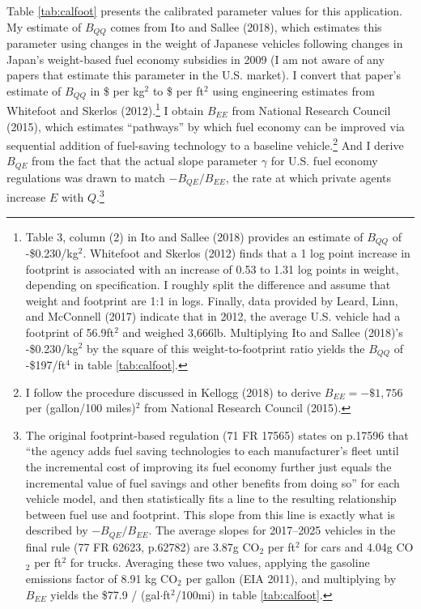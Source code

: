 \documentclass[12pt]{article}
\begin{document}
Table \ref{tab:calfoot} presents the calibrated parameter values for this application. My estimate of $B_{QQ}$ comes from Ito and Sallee (2018), which estimates this parameter using changes in the weight of Japanese vehicles following changes in Japan's weight-based fuel economy subsidies in 2009 (I am not aware of any papers that estimate this parameter in the U.S. market). I convert that paper's estimate of $B_{QQ}$ in \$ per kg$^2$ to \$ per ft$^2$ using engineering estimates from Whitefoot and Skerlos (2012).\footnote{Table 3, column (2) in Ito and Sallee (2018) provides an estimate of $B_{QQ}$ of -\$0.230/kg$^2$. Whitefoot and Skerlos (2012) finds that a 1 log point increase in footprint is associated with an increase of 0.53 to 1.31 log points in weight, depending on specification. I roughly split the difference and assume that weight and footprint are 1:1 in logs. Finally, data provided by Leard, Linn, and McConnell (2017) indicate that in 2012, the average U.S. vehicle had a footprint of 56.9ft$^2$ and weighed 3,666lb. Multiplying Ito and Sallee (2018)'s -\$0.230/kg$^2$ by the square of this weight-to-footprint ratio yields the $B_{QQ}$ of -\$197/ft$^4$ in table \ref{tab:calfoot}.} I obtain $B_{EE}$ from National Research Council (2015), which estimates ``pathways'' by which fuel economy can be improved via sequential addition of fuel-saving technology to a baseline vehicle.\footnote{I follow the procedure discussed in Kellogg (2018) to derive $B_{EE}=-\$1,756$ per (gallon/100 miles)$^2$ from National Research Council (2015).} And I derive $B_{QE}$ from the fact that the actual slope parameter $\gamma$ for U.S. fuel economy regulations was drawn to match $-B_{QE}/B_{EE}$, the rate at which private agents increase $E$ with $Q$.\footnote{The original footprint-based regulation (71 FR 17565) states on p.17596 that ``the agency adds fuel saving technologies to each manufacturer's fleet until the incremental cost of improving its fuel economy further just equals the incremental value of fuel savings and other benefits from doing so'' for each vehicle model, and then statistically fits a line to the resulting relationship between fuel use and footprint. This slope from this line is exactly what is described by $-B_{QE}/B_{EE}$. The average slopes for 2017--2025 vehicles in the final rule (77 FR 62623, p.62782) are 3.87g CO$_2$ per ft$^2$ for cars and 4.04g CO$_2$ per ft$^2$ for trucks. Averaging these two values, applying the gasoline emissions factor of 8.91 kg CO$_2$ per gallon (EIA 2011), and multiplying by $B_{EE}$ yields the \$77.9 / (gal$\cdot$ft$^2$/100mi) in table \ref{tab:calfoot}.} 
\end{document}
